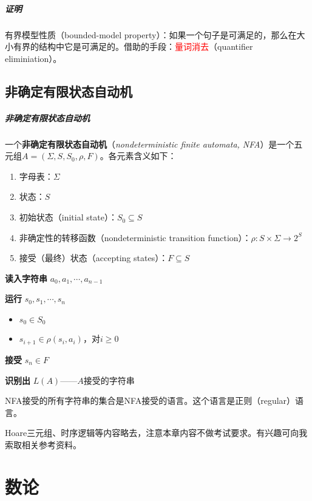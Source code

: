 \documentclass[b5paper,oneside]{ctexbook}
\newcommand{\Red}[1]{\textcolor[named]{red}{#1}}
\begin{document}
\paragraph{证明}有界模型性质（bounded-model property）：如果一个句子是可满足的，那么在大小有界的结构中它是可满足的。借助的手段：\Red{量词消去}（quantifier eliminiation）。
\section{非确定有限状态自动机}
\paragraph{非确定有限状态自动机}一个\textbf{非确定有限状态自动机}（\textit{nondeterministic finite automata, NFA}）是一个五元组$A = (\Sigma, S, S_0, \rho, F )$。各元素含义如下：
\begin{enumerate}
\item  字母表：$\Sigma$
\item  状态：$S$
\item  初始状态（initial state）：$S_0 \subseteq S$
\item  非确定性的转移函数（nondeterministic transition function）：$\rho : S \times \Sigma \to 2^S$
\item  接受（最终）状态（accepting states）：$F \subseteq S$
\end{enumerate}

\textbf{读入字符串} $a_0,a_1,\cdots ,a_{n-1}$

\textbf{运行} $s_0,s_1,\cdots ,s_n$
\begin{itemize}
\item $s_0\in S_0$
\item $s_{i+1}\in\rho(s_i,a_i)$，对$i\geq 0$
\end{itemize}

\textbf{接受} $s_n\in F$

\textbf{识别出} $L(A)$——$A$接受的字符串

NFA接受的所有字符串的集合是NFA接受的语言。这个语言是正则（regular）语言。

Hoare三元组、时序逻辑等内容略去，注意本章内容不做考试要求。有兴趣可向我索取相关参考资料。
\chapter{数论}
\label{ftoa}
\end{document}
